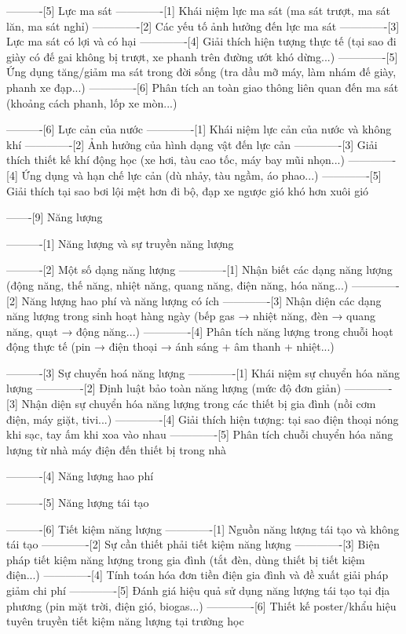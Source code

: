 ----------[5] Lực ma sát
-------------[1] Khái niệm lực ma sát (ma sát trượt, ma sát lăn, ma sát nghỉ)
-------------[2] Các yếu tố ảnh hưởng đến lực ma sát
-------------[3] Lực ma sát có lợi và có hại
-------------[4] Giải thích hiện tượng thực tế (tại sao đi giày có đế gai không bị trượt, xe phanh trên đường ướt khó dừng...)
-------------[5] Ứng dụng tăng/giảm ma sát trong đời sống (tra dầu mỡ máy, làm nhám đế giày, phanh xe đạp...)
-------------[6] Phân tích an toàn giao thông liên quan đến ma sát (khoảng cách phanh, lốp xe mòn...)

----------[6] Lực cản của nước
-------------[1] Khái niệm lực cản của nước và không khí
-------------[2] Ảnh hưởng của hình dạng vật đến lực cản
-------------[3] Giải thích thiết kế khí động học (xe hơi, tàu cao tốc, máy bay mũi nhọn...)
-------------[4] Ứng dụng và hạn chế lực cản (dù nhảy, tàu ngầm, áo phao...)
-------------[5] Giải thích tại sao bơi lội mệt hơn đi bộ, đạp xe ngược gió khó hơn xuôi gió

-------[9] Năng lượng

----------[1] Năng lượng và sự truyền năng lượng

----------[2] Một số dạng năng lượng
-------------[1] Nhận biết các dạng năng lượng (động năng, thế năng, nhiệt năng, quang năng, điện năng, hóa năng...)
-------------[2] Năng lượng hao phí và năng lượng có ích
-------------[3] Nhận diện các dạng năng lượng trong sinh hoạt hàng ngày (bếp gas → nhiệt năng, đèn → quang năng, quạt → động năng...)
-------------[4] Phân tích năng lượng trong chuỗi hoạt động thực tế (pin → điện thoại → ánh sáng + âm thanh + nhiệt...)

----------[3] Sự chuyển hoá năng lượng
-------------[1] Khái niệm sự chuyển hóa năng lượng
-------------[2] Định luật bảo toàn năng lượng (mức độ đơn giản)
-------------[3] Nhận diện sự chuyển hóa năng lượng trong các thiết bị gia đình (nồi cơm điện, máy giặt, tivi...)
-------------[4] Giải thích hiện tượng: tại sao điện thoại nóng khi sạc, tay ấm khi xoa vào nhau
-------------[5] Phân tích chuỗi chuyển hóa năng lượng từ nhà máy điện đến thiết bị trong nhà

----------[4] Năng lượng hao phí

----------[5] Năng lượng tái tạo

----------[6] Tiết kiệm năng lượng
-------------[1] Nguồn năng lượng tái tạo và không tái tạo
-------------[2] Sự cần thiết phải tiết kiệm năng lượng
-------------[3] Biện pháp tiết kiệm năng lượng trong gia đình (tắt đèn, dùng thiết bị tiết kiệm điện...)
-------------[4] Tính toán hóa đơn tiền điện gia đình và đề xuất giải pháp giảm chi phí
-------------[5] Đánh giá hiệu quả sử dụng năng lượng tái tạo tại địa phương (pin mặt trời, điện gió, biogas...)
-------------[6] Thiết kế poster/khẩu hiệu tuyên truyền tiết kiệm năng lượng tại trường học

